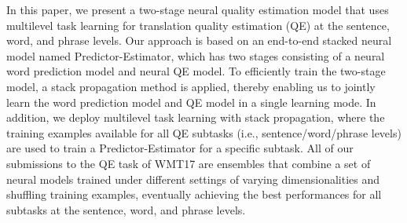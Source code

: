 In this paper, we present a two-stage neural quality estimation model that uses multilevel task learning for translation quality estimation (QE) at the sentence, word, and phrase levels. Our approach is based on an end-to-end stacked neural model named Predictor-Estimator, which has two stages consisting of a neural word prediction model and neural QE model. To efficiently train the two-stage model, a stack propagation method is applied, thereby enabling us to jointly learn the word prediction model and QE model in a single learning mode. In addition, we deploy multilevel task learning with stack propagation, where the training examples available for all QE subtasks (i.e., sentence/word/phrase levels) are used to train a Predictor-Estimator for a specific subtask. All of our submissions to the QE task of WMT17 are ensembles that combine a set of neural models trained under different settings of varying dimensionalities and shuffling training examples, eventually achieving the best performances for all subtasks at the sentence, word, and phrase levels.
